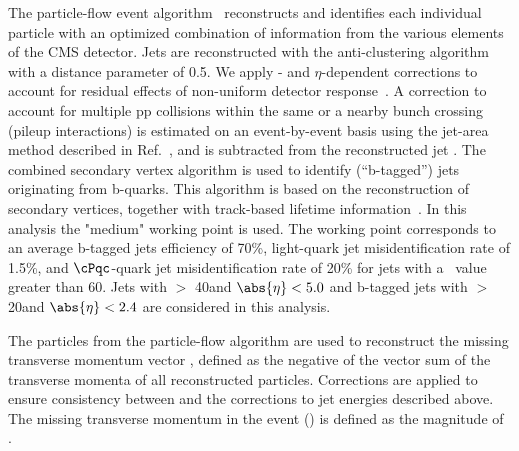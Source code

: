 The particle-flow event algorithm~\cite{CMS-PAS-PFT-09-001,CMS-PAS-PFT-10-001} reconstructs and identifies each individual particle with an optimized combination of information from the various elements of the CMS detector. 
Jets are reconstructed with the anti-\kt clustering
algorithm~\cite{Cacciari:2008gp} with a distance parameter of 0.5. We apply
\pt- and $\eta$-dependent corrections to account for residual
effects of non-uniform detector response~\cite{Chatrchyan:2011ds}.
A correction to account for multiple pp collisions within the same or a nearby
bunch crossing (pileup interactions) is estimated on an event-by-event basis using the
jet-area method described in Ref.~\cite{Cacciari:2007fd}, and is
subtracted from the reconstructed jet \pt.
The combined secondary vertex algorithm is used to identify (``b-tagged'') jets 
originating from b-quarks.  This algorithm 
 is based on the reconstruction of secondary vertices, together with track-based lifetime information~\cite{Chatrchyan:2012jua}. 
In this analysis the "medium" working point is used. The working point corresponds to an average b-tagged jets efficiency of 70\%, 
light-quark jet misidentification rate of 1.5\%, and $\cPqc$-quark jet misidentification rate of 20\% 
for jets with a \pt\ value greater than 60\GeV.
Jets with  \PT $>$ 40\GeV and $\abs{\eta} < 5.0$ and b-tagged jets with \PT $>$ 20\GeV and $\abs{\eta} < 2.4$ are considered in this analysis.


The particles from the particle-flow algorithm are used to reconstruct the missing transverse momentum  vector \ptvecmiss, defined as the negative of the vector sum of the transverse momenta of all reconstructed particles.  Corrections are applied to ensure consistency between
\ptvecmiss and the corrections to jet energies described above.  The missing transverse momentum in the event (\MPT) is defined as the magnitude of \ptvecmiss.



